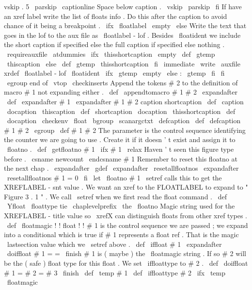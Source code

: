 {{{{{vskip
.
5
\
parskip
\
captionline
%
%
Space
below
caption
.
\
vskip
\
parskip
\
fi
%
%
If
have
an
xref
label
write
the
list
of
floats
info
.
Do
this
%
after
the
caption
to
avoid
chance
of
it
being
a
breakpoint
.
\
ifx
\
floatlabel
\
empty
\
else
%
Write
the
text
that
goes
in
the
lof
to
the
aux
file
as
%
\
floatlabel
-
lof
.
Besides
\
floatident
we
include
the
short
%
caption
if
specified
else
the
full
caption
if
specified
else
nothing
.
{
%
\
requireauxfile
\
atdummies
%
\
ifx
\
thisshortcaption
\
empty
\
def
\
gtemp
{
\
thiscaption
}
%
\
else
\
def
\
gtemp
{
\
thisshortcaption
}
%
\
fi
\
immediate
\
write
\
auxfile
{
xrdef
{
\
floatlabel
-
lof
}
{
\
floatident
\
ifx
\
gtemp
\
empty
\
else
:
\
gtemp
\
fi
}
}
%
}
%
\
fi
\
egroup
%
end
of
\
vtop
%
\
checkinserts
}
%
Append
the
tokens
#
2
to
the
definition
of
macro
#
1
not
expanding
either
.
%
\
def
\
appendtomacro
#
1
#
2
{
%
\
expandafter
\
def
\
expandafter
#
1
\
expandafter
{
#
1
#
2
}
%
}
%
caption
shortcaption
%
\
def
\
caption
{
\
docaption
\
thiscaption
}
\
def
\
shortcaption
{
\
docaption
\
thisshortcaption
}
\
def
\
docaption
{
\
checkenv
\
float
\
bgroup
\
scanargctxt
\
defcaption
}
\
def
\
defcaption
#
1
#
2
{
\
egroup
\
def
#
1
{
#
2
}
}
%
The
parameter
is
the
control
sequence
identifying
the
counter
we
are
%
going
to
use
.
Create
it
if
it
doesn
'
t
exist
and
assign
it
to
\
floatno
.
\
def
\
getfloatno
#
1
{
%
\
ifx
#
1
\
relax
%
Haven
'
t
seen
this
figure
type
before
.
\
csname
newcount
\
endcsname
#
1
%
%
%
Remember
to
reset
this
floatno
at
the
next
chap
.
\
expandafter
\
gdef
\
expandafter
\
resetallfloatnos
\
expandafter
{
\
resetallfloatnos
#
1
=
0
}
%
\
fi
\
let
\
floatno
#
1
%
}
%
\
setref
calls
this
to
get
the
XREFLABEL
-
snt
value
.
We
want
an
xref
%
to
the
FLOATLABEL
to
expand
to
"
Figure
3
.
1
"
.
We
call
\
setref
when
we
%
first
read
the
float
command
.
%
\
def
\
Yfloat
{
\
floattype
tie
\
chaplevelprefix
\
the
\
floatno
}
%
%
Magic
string
used
for
the
XREFLABEL
-
title
value
so
\
xrefX
can
%
distinguish
floats
from
other
xref
types
.
\
def
\
floatmagic
{
!
!
float
!
!
}
%
#
1
is
the
control
sequence
we
are
passed
;
we
expand
into
a
conditional
%
which
is
true
if
#
1
represents
a
float
ref
.
That
is
the
magic
%
\
lastsection
value
which
we
\
setref
above
.
%
\
def
\
iffloat
#
1
{
\
expandafter
\
doiffloat
#
1
=
=
\
finish
}
%
%
#
1
is
(
maybe
)
the
\
floatmagic
string
.
If
so
#
2
will
be
the
%
(
safe
)
float
type
for
this
float
.
We
set
\
iffloattype
to
#
2
.
%
\
def
\
doiffloat
#
1
=
#
2
=
#
3
\
finish
{
%
\
def
\
temp
{
#
1
}
%
\
def
\
iffloattype
{
#
2
}
%
\
ifx
\
temp
\
floatmagic
}}}}}

